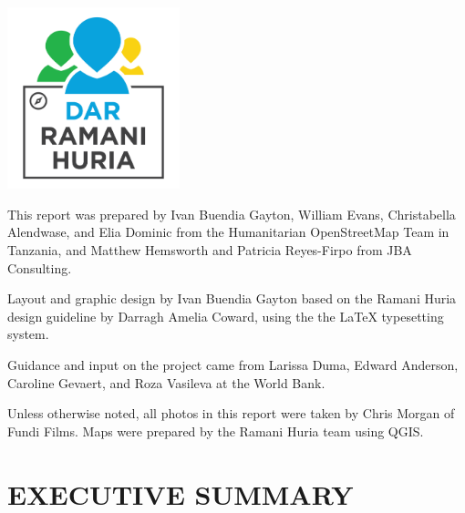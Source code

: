 \documentclass[a4paper,12pt,twoside]{article}
\begin{document}
\newpage
\color{RHgrey}

\begin{center}
{\includegraphics[width=5cm]{Dar_Ramani_Huria_logo.png}}
\end{center}

This report was prepared by Ivan Buendia Gayton, William Evans, Christabella Alendwase, and Elia Dominic from the Humanitarian OpenStreetMap Team in Tanzania, and Matthew Hemsworth and Patricia Reyes-Firpo from JBA Consulting.

\medskip

Layout and graphic design by Ivan Buendia Gayton based on the Ramani Huria design guideline by Darragh Amelia Coward, using the the \LaTeX { } typesetting system.

\medskip

Guidance and input on the project came from Larissa Duma, Edward Anderson, Caroline Gevaert, and Roza Vasileva at the World Bank.

\medskip

Unless otherwise noted, all photos in this report were taken by Chris Morgan of Fundi Films. Maps were prepared by the Ramani Huria team using QGIS.

\newpage

\tableofcontents


\newpage
\color{RHblue}
\section{EXECUTIVE SUMMARY}
\label{executivesummary}
\end{document}
